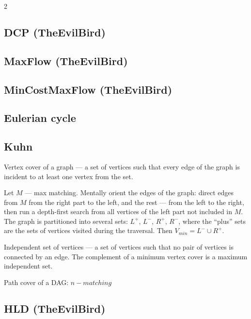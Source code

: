 \documentclass[a4paper]{article}
\begin{document}
\begin{multicols*}{2}
        \subsection{DCP (TheEvilBird)}
            
        
        \subsection{MaxFlow (TheEvilBird)}
            
                
        \subsection{MinCostMaxFlow (TheEvilBird)}
            
        
        \subsection{Eulerian cycle}
            
        \subsection{Kuhn}
            

        Vertex cover of a graph --- a set of vertices such that every edge of the graph is incident to at least one vertex from the set.
        
        Let $M$ --- max matching. Mentally orient the edges of the graph: direct edges from $M$ from the right part to the left, and the rest --- from the left to the right, 
        then run a depth-first search from all vertices of the left part not included in $M$.
        The graph is partitioned into several sets: $L^{+}$, $L^{-}$, $R^{+}$, $R^{-}$, where the ``plus'' sets are the sets of vertices visited during the traversal. Then $V_{min} = L^{-} \cup R^{+}$.

        Independent set of vertices --- a set of vertices such that no pair of vertices is connected by an edge. The complement of a minimum vertex cover is a maximum independent set.

        Path cover of a DAG: $n - matching$
        
        \subsection{HLD (TheEvilBird)}
            


\end{multicols*}
\end{document}
